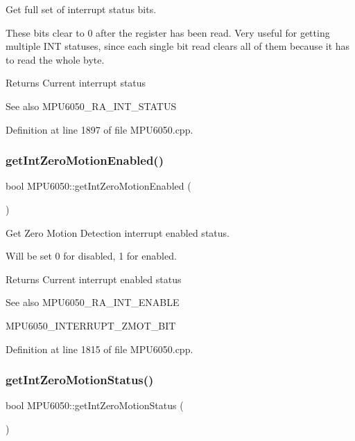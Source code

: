 Get full set of interrupt status bits. 

These bits clear to 0 after the register has been read. Very useful for getting multiple I\+NT statuses, since each single bit read clears all of them because it has to read the whole byte. \begin{DoxyReturn}{Returns}
Current interrupt status 
\end{DoxyReturn}
\begin{DoxySeeAlso}{See also}
M\+P\+U6050\+\_\+\+R\+A\+\_\+\+I\+N\+T\+\_\+\+S\+T\+A\+T\+US 
\end{DoxySeeAlso}


Definition at line 1897 of file M\+P\+U6050.\+cpp.

\mbox{\label{classMPU6050_ab3cc9bcaca6cec61e7f3f0c6c8a37db5}} 
\subsubsection{\texorpdfstring{getIntZeroMotionEnabled()}{getIntZeroMotionEnabled()}}
{\footnotesize\ttfamily bool M\+P\+U6050\+::get\+Int\+Zero\+Motion\+Enabled (\begin{DoxyParamCaption}{ }\end{DoxyParamCaption})}



Get Zero Motion Detection interrupt enabled status. 

Will be set 0 for disabled, 1 for enabled. \begin{DoxyReturn}{Returns}
Current interrupt enabled status 
\end{DoxyReturn}
\begin{DoxySeeAlso}{See also}
M\+P\+U6050\+\_\+\+R\+A\+\_\+\+I\+N\+T\+\_\+\+E\+N\+A\+B\+LE 

M\+P\+U6050\+\_\+\+I\+N\+T\+E\+R\+R\+U\+P\+T\+\_\+\+Z\+M\+O\+T\+\_\+\+B\+IT 
\end{DoxySeeAlso}


Definition at line 1815 of file M\+P\+U6050.\+cpp.

\mbox{\label{classMPU6050_afa73a5ffdc423736ae88702a469ba3a0}} 
\subsubsection{\texorpdfstring{getIntZeroMotionStatus()}{getIntZeroMotionStatus()}}
{\footnotesize\ttfamily bool M\+P\+U6050\+::get\+Int\+Zero\+Motion\+Status (\begin{DoxyParamCaption}{ }\end{DoxyParamCaption})}



